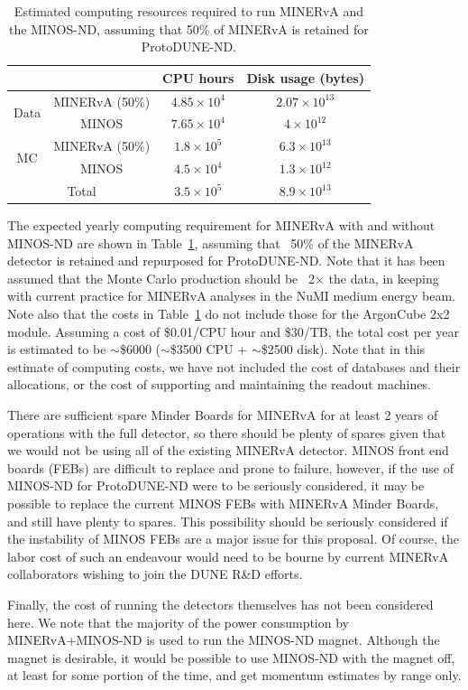 \begin{table}[htbp]
  \centering  
      {\renewcommand{\arraystretch}{1.2}
        \begin{tabular}{cccc}
          \hline\hline
          & & CPU hours & Disk usage (bytes) \\
          \hline
          \multirow{2}{*}{Data} & MINERvA (50\%) & $4.85\times 10^{4}$ & $2.07\times 10^{13}$ \\
          & MINOS & $7.65\times 10^{4}$ & $4\times 10^{12}$ \\
          \hline
          \multirow{2}{*}{MC} & MINERvA (50\%) & $1.8\times 10^{5}$ & $6.3\times 10^{13}$ \\
          & MINOS & $4.5\times 10^{4}$ & $1.3\times 10^{12}$ \\          
          \hline
          \multicolumn{2}{c}{Total} & $3.5\times 10^{5}$ & $8.9\times 10^{13}$ \\
          \hline\hline
      \end{tabular}}  
      \caption{Estimated computing resources required to run MINERvA and the MINOS-ND, assuming that 50\% of MINERvA is retained for ProtoDUNE-ND.}
      \label{tab:minerva-computing}
\end{table}
The expected yearly computing requirement for MINERvA with and without MINOS-ND are shown in Table~\ref{tab:minerva-computing}, assuming that ~50\% of the MINERvA detector is retained and repurposed for ProtoDUNE-ND. Note that it has been assumed that the Monte Carlo production should be ~2$\times$ the data, in keeping with current practice for MINERvA analyses in the NuMI medium energy beam. Note also that the costs in Table~\ref{tab:minerva-computing} do not include those for the ArgonCube 2x2 module. Assuming a cost of \$0.01/CPU hour and \$30/TB, the total cost per year is estimated to be $\sim$\$6000 ($\sim$\$3500 CPU + $\sim$\$2500 disk). Note that in this estimate of computing costs, we have not included the cost of databases and their allocations, or the cost of supporting and maintaining the readout machines.

There are sufficient spare Minder Boards for MINERvA for at least 2 years of operations with the full detector, so there should be plenty of spares given that we would not be using all of the existing MINERvA detector. MINOS front end boards (FEBs) are difficult to replace and prone to failure, however, if the use of MINOS-ND for ProtoDUNE-ND were to be seriously considered, it may be possible to replace the current MINOS FEBs with MINERvA Minder Boards, and still have plenty to spares. This possibility should be seriously considered if the instability of MINOS FEBs are a major issue for this proposal. Of course, the labor cost of such an endeavour would need to be bourne by current MINERvA collaborators wishing to join the DUNE R\&D efforts. 

Finally, the cost of running the detectors themselves has not been considered here. We note that the majority of the power consumption by MINERvA+MINOS-ND is used to run the MINOS-ND magnet. Although the magnet is desirable, it would be possible to use MINOS-ND with the magnet off, at least for some portion of the time, and get momentum estimates by range only.
